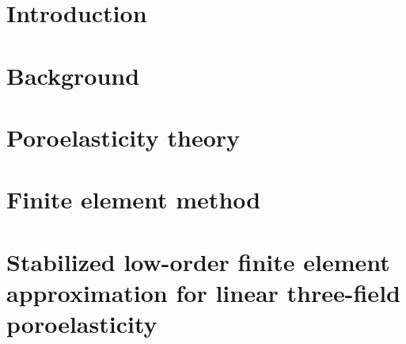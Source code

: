 \documentclass[letterpaper,12pt]{report}
\begin{document}
\def\localpath{contents/frontmatter}





\tableofcontents
\newpage
%






%




\chapter{Introduction}

 
\chapter{Background}


\chapter{Poroelasticity theory}





\chapter{Finite element method}





\chapter{Stabilized low-order finite element approximation for linear three-field poroelasticity}
\label{chap:linear_poro}

\end{document}
